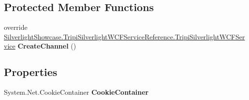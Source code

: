 \subsection*{Protected Member Functions}
\begin{DoxyCompactItemize}
\item 
\hypertarget{class_silverlight_showcase_1_1_tripi_silverlight_w_c_f_service_reference_1_1_tripi_silverlight_w_c_f_service_client_a14df5c718248373918103c7de8e18934}{
override \hyperlink{interface_silverlight_showcase_1_1_tripi_silverlight_w_c_f_service_reference_1_1_tripi_silverlight_w_c_f_service}{SilverlightShowcase.TripiSilverlightWCFServiceReference.TripiSilverlightWCFService} {\bfseries CreateChannel} ()}
\label{class_silverlight_showcase_1_1_tripi_silverlight_w_c_f_service_reference_1_1_tripi_silverlight_w_c_f_service_client_a14df5c718248373918103c7de8e18934}

\end{DoxyCompactItemize}
\subsection*{Properties}
\begin{DoxyCompactItemize}
\item 
\hypertarget{class_silverlight_showcase_1_1_tripi_silverlight_w_c_f_service_reference_1_1_tripi_silverlight_w_c_f_service_client_aa325fac7fa1a128193b7946f6180f24a}{
System.Net.CookieContainer {\bfseries CookieContainer}}
\label{class_silverlight_showcase_1_1_tripi_silverlight_w_c_f_service_reference_1_1_tripi_silverlight_w_c_f_service_client_aa325fac7fa1a128193b7946f6180f24a}

\end{DoxyCompactItemize}
